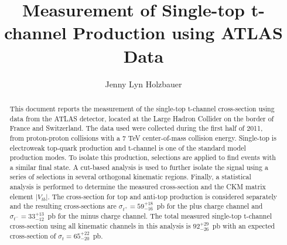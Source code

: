 \documentclass{msuphddissertation}
\author{Jenny Lyn Holzbauer} %
\title{Measurement of Single-top t-channel Production using ATLAS Data} %
\begin{document}
\maketitlepage %
\begin{abstract}
This document reports the measurement of the single-top t-channel cross-section using data from the ATLAS detector, located at the Large Hadron Collider on the border of France and Switzerland.  The data used were collected during the first half of 2011, from proton-proton collisions with a 7 TeV center-of-mass collision energy.  Single-top is electroweak top-quark production and t-channel is one of the standard model production modes.  To isolate this production, selections are applied to find events with a similar final state.  A cut-based analysis is used to further isolate the signal using a series of selections in several orthogonal kinematic regions.  Finally, a statistical analysis is performed to determine the measured cross-section and the CKM matrix element $|V_{tb}|$.  The cross-section for top and anti-top production is considered separately and the resulting cross-sections are $\sigma_{t^{+}}= 59^{+18}_{-16}$~pb for the plus charge channel and $\sigma_{t^{-}}= 33^{+13}_{-12}$~pb for the minus charge channel.  The total measured single-top t-channel cross-section using all kinematic channels in this analysis is  $92^{+29}_{-26}$~pb with an expected cross-section of $\sigma_{t}= 65^{+22}_{-20}$~pb.

\end{abstract}


\begin{copyrt}
\end{copyrt}


\end{document}
